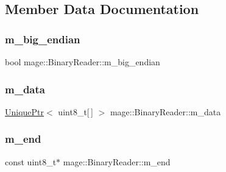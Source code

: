 \subsection{Member Data Documentation}
\hypertarget{classmage_1_1_binary_reader_a8d23fde958e08efe248edb5d92861113}{}\label{classmage_1_1_binary_reader_a8d23fde958e08efe248edb5d92861113} 
\subsubsection{\texorpdfstring{m\+\_\+big\+\_\+endian}{m\_big\_endian}}
{\footnotesize\ttfamily bool mage\+::\+Binary\+Reader\+::m\+\_\+big\+\_\+endian\hspace{0.3cm}{\ttfamily [private]}}

\hypertarget{classmage_1_1_binary_reader_a34820a214a5b98e09beb12e8a465b0e3}{}\label{classmage_1_1_binary_reader_a34820a214a5b98e09beb12e8a465b0e3} 
\subsubsection{\texorpdfstring{m\+\_\+data}{m\_data}}
{\footnotesize\ttfamily \hyperlink{namespacemage_a8c307fbcc33bce9b7f2aa4c26c3b95cf}{Unique\+Ptr}$<$ uint8\+\_\+t\mbox{[}$\,$\mbox{]} $>$ mage\+::\+Binary\+Reader\+::m\+\_\+data\hspace{0.3cm}{\ttfamily [private]}}

\hypertarget{classmage_1_1_binary_reader_a929b6480629014c24263ec3042b1f364}{}\label{classmage_1_1_binary_reader_a929b6480629014c24263ec3042b1f364} 
\subsubsection{\texorpdfstring{m\+\_\+end}{m\_end}}
{\footnotesize\ttfamily const uint8\+\_\+t$\ast$ mage\+::\+Binary\+Reader\+::m\+\_\+end\hspace{0.3cm}{\ttfamily [private]}}

\hypertarget{classmage_1_1_binary_reader_a9c97c02d53ce60a9952751ad4f55414f}{}\label{classmage_1_1_binary_reader_a9c97c02d53ce60a9952751ad4f55414f} 

